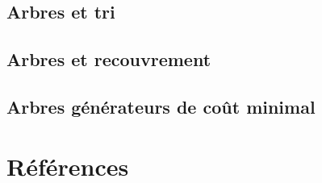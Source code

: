 \documentclass[
  letterpaper,
]{scrbook}
\newlength{\cslhangindent}
\newlength{\cslentryspacingunit} %
\newenvironment{CSLReferences}[2] %
 {%
  \setlength{\parindent}{0pt}
  \ifodd #1
  \let\oldpar\par
  \def\par{\hangindent=\cslhangindent\oldpar}
  \fi
  \setlength{\parskip}{#2\cslentryspacingunit}
 }%
 {}
\theoremstyle{definition}
\theoremstyle{definition}
\theoremstyle{plain}
\theoremstyle{remark}
\begin{document}
\hypertarget{arbres-et-tri}{%
\section{Arbres et tri}\label{arbres-et-tri}}

\hypertarget{arbres-et-recouvrement}{%
\section{Arbres et recouvrement}\label{arbres-et-recouvrement}}

\hypertarget{arbres-guxe9nuxe9rateurs-de-couxfbt-minimal}{%
\section{Arbres générateurs de coût
minimal}\label{arbres-guxe9nuxe9rateurs-de-couxfbt-minimal}}


\hypertarget{ruxe9fuxe9rences}{%
\chapter*{Références}\label{ruxe9fuxe9rences}}


\hypertarget{refs}{}
\begin{CSLReferences}{0}{0}
\end{CSLReferences}


\backmatter
\end{document}

